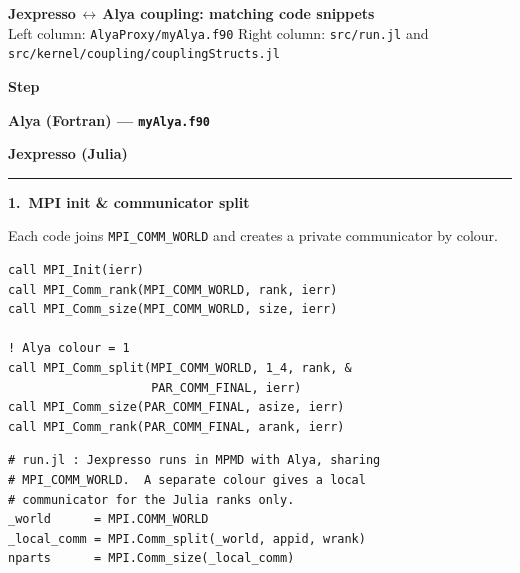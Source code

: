 \documentclass[10pt,landscape]{article}
\newlength{\stepW}\setlength{\stepW}{3.0cm}
\newlength{\codeW}\setlength{\codeW}{10.6cm}
\newcommand{\stepHdr}[1]{%
  \par\medskip
  \noindent\textcolor{ruleC}{\rule{\linewidth}{0.3pt}}\par
  \noindent\textbf{#1}\par\smallskip
}
\begin{document}
\begin{center}
{\Large\bfseries Jexpresso\,$\leftrightarrow$\,Alya coupling: matching code snippets}\\[2pt]
{\small Left column: \texttt{AlyaProxy/myAlya.f90}\quad
 Right column: \texttt{src/run.jl} and \texttt{src/kernel/coupling/couplingStructs.jl}}
\end{center}

\medskip

\noindent
\begin{minipage}[t]{\stepW}\centering\textbf{Step}\end{minipage}\hfill
\begin{minipage}[t]{\codeW}\centering\textbf{Alya (Fortran) --- \texttt{myAlya.f90}}\end{minipage}\hfill
\begin{minipage}[t]{\codeW}\centering\textbf{Jexpresso (Julia)}\end{minipage}

\stepHdr{1.\ MPI init \& communicator split}
\noindent
\begin{minipage}[t]{\stepW}
\footnotesize Each code joins \texttt{MPI\_COMM\_WORLD} and creates a private communicator by colour.
\end{minipage}\hfill
\begin{minipage}[t]{\codeW}
\begin{lstlisting}[style=fortran]
call MPI_Init(ierr)
call MPI_Comm_rank(MPI_COMM_WORLD, rank, ierr)
call MPI_Comm_size(MPI_COMM_WORLD, size, ierr)

! Alya colour = 1
call MPI_Comm_split(MPI_COMM_WORLD, 1_4, rank, &
                    PAR_COMM_FINAL, ierr)
call MPI_Comm_size(PAR_COMM_FINAL, asize, ierr)
call MPI_Comm_rank(PAR_COMM_FINAL, arank, ierr)
\end{lstlisting}
\end{minipage}\hfill
\begin{minipage}[t]{\codeW}
\begin{lstlisting}[style=julia]
# run.jl : Jexpresso runs in MPMD with Alya, sharing
# MPI_COMM_WORLD.  A separate colour gives a local
# communicator for the Julia ranks only.
_world      = MPI.COMM_WORLD
_local_comm = MPI.Comm_split(_world, appid, wrank)
nparts      = MPI.Comm_size(_local_comm)
\end{lstlisting}
\end{minipage}
\end{document}
